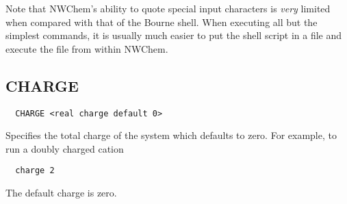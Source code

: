 Note that NWChem's ability to quote special input characters is {\em
  very} limited when compared with that of the Bourne shell.  When
executing all but the simplest commands, it is usually much easier to
put the shell script in a file and execute the file from within
NWChem.

\subsection{CHARGE}
\label{sec:charge}

\begin{verbatim}
  CHARGE <real charge default 0>
\end{verbatim}

Specifies the total charge of the system which defaults to zero.
For example, to run a doubly charged cation
\begin{verbatim}
  charge 2
\end{verbatim}

The default charge is zero. 

